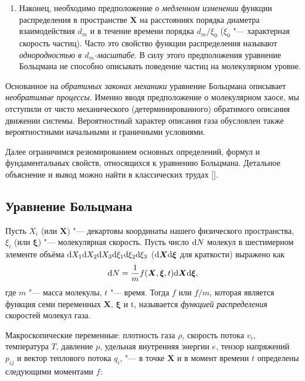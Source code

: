\begin{enumerate}
	\item Наконец, необходимо предположение о \textit{медленном изменении} функции распределения
в пространстве \(\boldsymbol{X}\) на расстояниях порядка диаметра взаимодействия \(d_m\)
и в течение времени порядка \(d_m/\xi_0\) (\(\xi_0\) "--- характерная скорость частиц).
Часто это свойство функции распределения называют \textit{однородностью в \(d_m\)-масштабе}.
В силу этого предположения уравнение Больцмана не способно описывать поведение частиц на молекулярном уровне.

\end{enumerate}

Основанное на \textit{обратимых законах механики} уравнение Больцмана описывает \textit{необратимые процессы}.
Именно вводя предположение о молекулярном хаосе,
мы отступили от чисто механического (детерминированного) обратимого описания движении системы.
Вероятностный характер описания газа обусловлен также вероятностными начальными и граничными условиями.

Далее ограничимся резюмированием основных определений, формул и фундаментальных свойств, относящихся к уравнению Больцмана.
Детальное объяснение и вывод можно найти в классических трудах [].

\subsection{Уравнение Больцмана}

Пусть \(X_i\) (или \(\boldsymbol X\)) "--- декартовы координаты нашего физического пространства,
\(\xi_i\) (или \(\boldsymbol\xi\)) "--- молекулярная скорость.
Пусть число \(\mathrm{d} N\) молекул в шестимерном элементе объёма \(\mathrm{d} X_1\mathrm{d} X_2\mathrm{d} X_3\mathrm{d}\xi_1\mathrm{d}\xi_2\mathrm{d}\xi_3\)
(\(\mathrm{d}\boldsymbol X\mathrm{d}\boldsymbol\xi\) для краткости) выражено как
\[ \mathrm{d} N = \frac1{m} f(\boldsymbol X,\boldsymbol\xi,t)\mathrm{d}\boldsymbol X\mathrm{d}\boldsymbol\xi, \]
где \(m\) "--- масса молекулы, \(t\) "--- время.
Тогда \(f\) или \(f/m\), которая является функция семи переменных \(\boldsymbol X\), \(\boldsymbol\xi\) и t,
называется \textit{функцией распределения} скоростей молекул газа.

Макроскопические переменные: плотность газа \(\rho\), скорость потока \(v_i\),
температура \(T\), давление \(p\), удельная внутренняя энергии \(e\), тензор напряжений \(p_{ij}\)
и вектор теплового потока \(q_i\), "--- в точке \(\boldsymbol X\) и в момент времени \(t\) определены следующими моментами \(f\):

